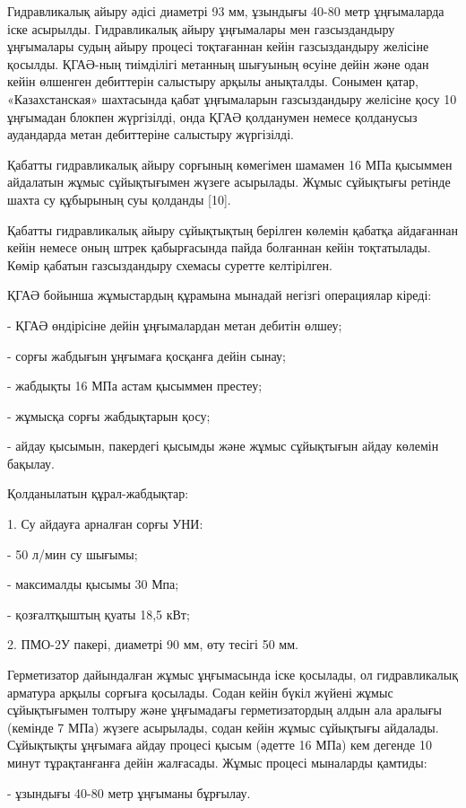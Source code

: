 Гидравликалық айыру әдісі диаметрі 93 мм, ұзындығы 40-80 метр
ұңғымаларда іске асырылды. Гидравликалық айыру ұңғымалары мен
газсыздандыру ұңғымалары судың айыру процесі тоқтағаннан кейін
газсыздандыру желісіне қосылды. ҚГАӘ-ның тиімділігі метанның шығуының
өсуіне дейін және одан кейін өлшенген дебиттерін салыстыру арқылы
анықталды. Сонымен қатар, «Казахстанская» шахтасында қабат ұңғымаларын
газсыздандыру желісіне қосу 10 ұңғымадан блокпен жүргізілді, онда ҚГАӘ
қолданумен немесе қолданусыз аудандарда метан дебиттеріне салыстыру
жүргізілді.

Қабатты гидравликалық айыру сорғының көмегімен шамамен 16 МПа қысыммен
айдалатын жұмыс сұйықтығымен жүзеге асырылады. Жұмыс сұйықтығы ретінде
шахта су құбырының суы қолданды {[}10{]}.

Қабатты гидравликалық айыру сұйықтықтың берілген көлемін қабатқа
айдағаннан кейін немесе оның штрек қабырғасында пайда болғаннан кейін
тоқтатылады. Көмір қабатын газсыздандыру схемасы суретте келтірілген.

ҚГАӘ бойынша жұмыстардың құрамына мынадай негізгі операциялар кіреді:

- ҚГАӘ өндірісіне дейін ұңғымалардан метан дебитін өлшеу;

- сорғы жабдығын ұңғымаға қосқанға дейін сынау;

- жабдықты 16 МПа астам қысыммен престеу;

- жұмысқа сорғы жабдықтарын қосу;

- айдау қысымын, пакердегі қысымды және жұмыс сұйықтығын айдау көлемін
бақылау.

Қолданылатын құрал-жабдықтар:

1. Су айдауға арналған сорғы УНИ:

- 50 л/мин су шығымы;

- максималды қысымы 30 Мпа;

- қозғалтқыштың қуаты 18,5 кВт;

2. ПМО-2У пакері, диаметрі 90 мм, өту тесігі 50 мм.

Герметизатор дайындалған жұмыс ұңғымасында іске қосылады, ол
гидравликалық арматура арқылы сорғыға қосылады. Содан кейін бүкіл жүйені
жұмыс сұйықтығымен толтыру және ұңғымадағы герметизатордың алдын ала
аралығы (кемінде 7 МПа) жүзеге асырылады, содан кейін жұмыс сұйықтығы
айдалады. Сұйықтықты ұңғымаға айдау процесі қысым (әдетте 16 МПа) кем
дегенде 10 минут тұрақтанғанға дейін жалғасады. Жұмыс процесі мыналарды
қамтиды:

- ұзындығы 40-80 метр ұңғыманы бұрғылау.

